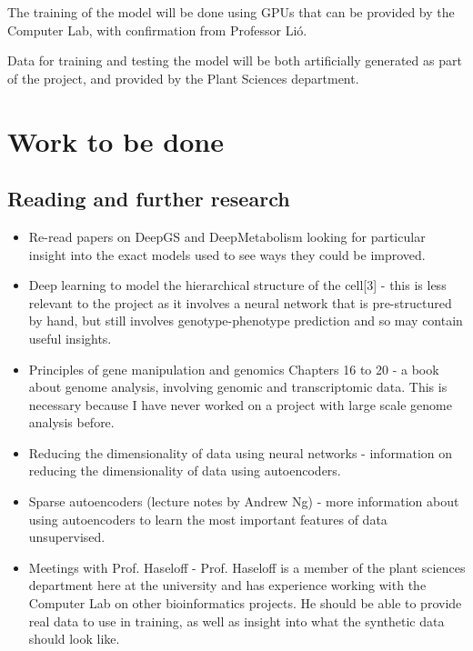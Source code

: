 \documentclass[12pt,a4paper,twoside,openany]{article}
\begin{document}
The training of the model will be done using GPUs that can be provided by the Computer Lab, with confirmation from Professor Li\'o.

Data for training and testing the model will be both artificially generated as part of the project, and provided by the Plant Sciences department.

\section*{Work to be done}

\subsection*{Reading and further research}

\begin{itemize}
    \item Re-read papers on DeepGS and DeepMetabolism looking for particular insight into the exact models used to see ways they could be improved.
    
    \item Deep learning to model the hierarchical structure of the cell[3] - this is less relevant to the project as it involves a neural network that is pre-structured by hand, but still involves genotype-phenotype prediction and so may contain useful insights.
    
    \item Principles of gene manipulation and genomics\cite{Genomics} Chapters 16 to 20 - a book about genome analysis, involving genomic and transcriptomic data. This is necessary because I have never worked on a project with large scale genome analysis before.
    
    \item Reducing the dimensionality of data using neural networks\cite{Encoders} - information on reducing the dimensionality of data using autoencoders.
    
    \item Sparse autoencoders (lecture notes by Andrew Ng) - more information about using autoencoders to learn the most important features of data unsupervised.
    
    \item Meetings with Prof. Haseloff - Prof. Haseloff is a member of the plant sciences department here at the university and has experience working with the Computer Lab on other bioinformatics projects. He should be able to provide real data to use in training, as well as insight into what the synthetic data should look like.
    
\end{itemize}
\end{document}
